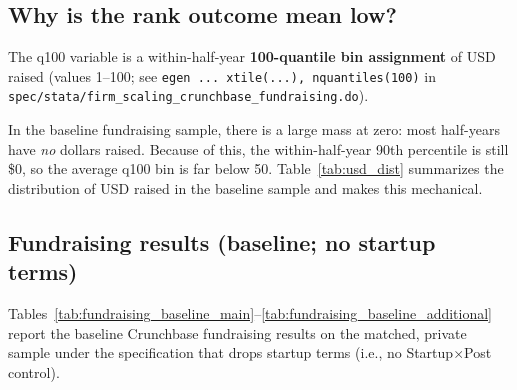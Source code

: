 \documentclass{article}
\newcommand{\cleanedresultsdir}{../results/cleaned/tex}
\begin{document}
\subsection*{Why is the rank outcome mean low?}
The q100 variable is a within-half-year \textbf{100-quantile bin assignment} of USD raised (values 1--100; see
\texttt{egen ... xtile(...), nquantiles(100)} in \texttt{spec/stata/firm\_scaling\_crunchbase\_fundraising.do}).
\par
In the baseline fundraising sample, there is a large mass at zero: most half-years have \emph{no} dollars raised.
Because of this, the within-half-year 90th percentile is still \$0, so the average q100 bin is far below 50.
Table~\ref{tab:usd_dist} summarizes the distribution of USD raised in the baseline sample and makes this mechanical.

\begin{table}[H]
\caption{Distribution of USD raised (baseline fundraising sample)}
\label{tab:usd_dist}

\end{table}

\clearpage
\subsection*{Fundraising results (baseline; no startup terms)}
Tables~\ref{tab:fundraising_baseline_main}--\ref{tab:fundraising_baseline_additional} report the baseline Crunchbase fundraising
results on the matched, private sample under the specification that drops startup terms (i.e., no Startup$\times$Post control).

\begin{table}[H]
\caption{Fundraising outcomes (baseline)}
\label{tab:fundraising_baseline_main}

\end{table}

\begin{table}[H]
\caption{Additional fundraising outcomes (baseline)}
\label{tab:fundraising_baseline_additional}

\end{table}
\end{document}
